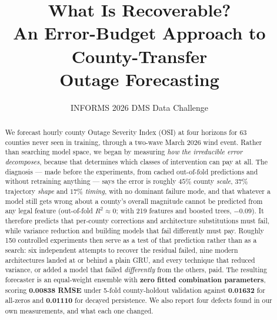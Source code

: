 \documentclass[10pt,letterpaper,twocolumn]{article}
\title{\vspace{-2.2em}\textbf{What Is Recoverable?}\\[2pt]
\large An Error-Budget Approach to County-Transfer\\Outage Forecasting}
\author{\normalsize INFORMS 2026 DMS Data Challenge}
\date{\vspace{-1em}}
\begin{document}
\maketitle
\vspace{-1.5em}

\begin{abstract}\small
\noindent We forecast hourly county Outage Severity Index (OSI) at four horizons
for 63 counties never seen in training, through a two-wave March 2026 wind event.
Rather than searching model space, we began by measuring \emph{how the
irreducible error decomposes}, because that determines which classes of
intervention can pay at all. The diagnosis --- made before the experiments, from
cached out-of-fold predictions and without retraining anything --- says the error
is roughly $45\%$ county
\emph{scale}, $37\%$ trajectory \emph{shape} and $17\%$ \emph{timing}, with no
dominant failure mode, and that whatever a model still gets wrong about a
county's overall magnitude cannot be predicted from any legal feature
(out-of-fold $R^2 \approx 0$; with 219 features and boosted trees, $-0.09$). It
therefore predicts that per-county corrections and architecture substitutions
must fail, while variance reduction and building models that fail differently
must pay. Roughly
150 controlled experiments then serve as a test of that prediction rather than as
a search: six independent attempts to recover the residual failed, nine modern architectures landed at or behind a plain GRU, and every technique that reduced
variance, or added a model that failed \emph{differently} from the others,
paid. The resulting forecaster is an
equal-weight ensemble with \textbf{zero fitted combination parameters}, scoring
\textbf{0.00838 RMSE} under 5-fold county-holdout validation against
\textbf{0.01632} for all-zeros and \textbf{0.01110} for decayed persistence. We also report four defects found in our own
measurements, and what each one changed.

\noindent{}
\end{abstract}
\end{document}

